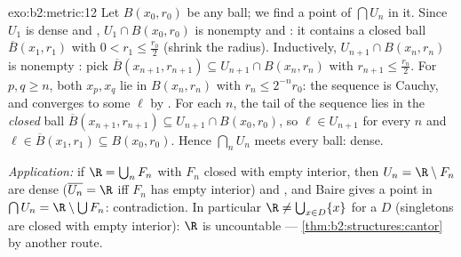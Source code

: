 \begin{solution}{exo:b2:metric:12}
Let $B(x_0, r_0)$ be any ball; we find a point of $\bigcap U_n$
in it. Since $U_1$ is dense and , $U_1 \cap B(x_0, r_0)$ is
nonempty and : it contains a closed ball $\overline B(x_1,
r_1)$ with $0 < r_1 \leq \frac{r_0}2$ (shrink the radius).
Inductively, $U_{n+1} \cap B(x_n, r_n)$ is nonempty : pick
$\overline B(x_{n+1}, r_{n+1}) \subseteq U_{n+1} \cap B(x_n,
r_n)$ with $r_{n+1} \leq \frac{r_n}2$. For $p, q \geq n$, both
$x_p, x_q$ lie in $B(x_n, r_n)$ with $r_n \leq 2^{-n}r_0$: the
sequence is Cauchy, and converges to some $\ell$ by
. For each $n$, the tail of the sequence lies in the
\emph{closed} ball $\overline B(x_{n+1}, r_{n+1}) \subseteq U_{n+1}
\cap B(x_0, r_0)$, so $\ell \in U_{n+1}$ for every $n$ and $\ell
\in \overline B(x_1, r_1) \subseteq B(x_0, r_0)$. Hence
$\bigcap_n U_n$ meets every ball: dense.

\emph{Application:} if $\R = \bigcup_n F_n$ with $F_n$ closed
with empty interior, then $U_n = \R \setminus F_n$ are dense
($\overline{U_n} = \R$ iff $F_n$ has empty interior) and ,
and Baire gives a point in $\bigcap U_n = \R \setminus \bigcup
F_n$: contradiction. In particular $\R \neq \bigcup_{x \in D}
\{x\}$ for a  $D$ (singletons are closed with empty
interior): $\R$ is uncountable ---
\cref{thm:b2:structures:cantor} by another route.
\end{solution}

